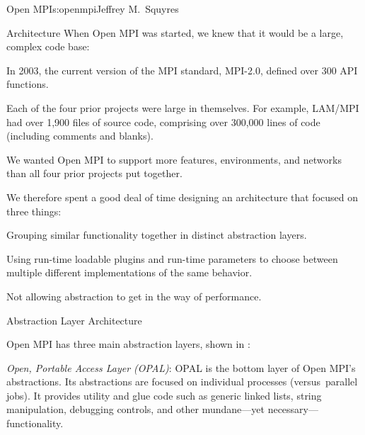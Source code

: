 \begin{aosachapter}{Open MPI}{s:openmpi}{Jeffrey M.\ Squyres}
\begin{aosasect1}{Architecture}
When Open MPI was started, we knew that it would be a large, complex
code base:

\begin{aosaitemize}
\item In 2003, the current version of the MPI standard, MPI-2.0,
  defined over 300 API functions.
\item Each of the four prior projects were large in themselves.  For
  example, LAM/MPI had over 1,900 files of source code, comprising
  over 300,000 lines of code (including comments and blanks).
\item We wanted Open MPI to support more features, environments, and
  networks than all four prior projects put together.
\end{aosaitemize}

\noindent We therefore spent a good deal of time designing an architecture that
focused on three things:

\begin{aosaenumerate}
\item Grouping similar functionality together in distinct abstraction
  layers.
\item Using run-time loadable plugins and run-time parameters to
  choose between multiple different implementations of the same
  behavior.
\item Not allowing abstraction to get in the way of performance.
\end{aosaenumerate}


\begin{aosasect2}{Abstraction Layer Architecture}


Open MPI has three main abstraction layers, shown in
:

\begin{aosaitemize}
\item \emph{Open, Portable Access Layer (OPAL)}: OPAL is the bottom
  layer of Open MPI's abstractions.  Its abstractions are focused on
  individual processes (versus\ parallel jobs).  It provides utility and
  glue code such as generic linked lists, string manipulation,
  debugging controls, and other mundane---yet necessary---functionality.


\end{aosaitemize}
\end{aosasect2}
\end{aosasect1}
\end{aosachapter}
